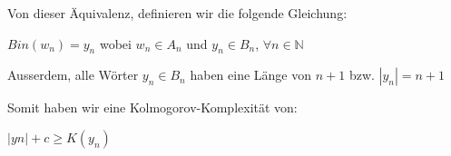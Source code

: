 \documentclass{article}
\begin{document}
    
    \par 
  	\noindent
  	Von dieser Äquivalenz, definieren wir die folgende Gleichung: 
	\begin{center}
	$Bin(w_{n}) = y_{n}$ wobei $w_{n} \in A_{n}$ und $y_{n} \in B_{n}$, $\forall n \in \mathbb{N}$
\end{center}	  	
  	
  	\par 
  	\noindent
  	Ausserdem, alle Wörter $y_{n} \in B_{n}$ haben eine Länge von $n + 1$ bzw. $|y_{n}| = n + 1$
  	
    \par 
    \noindent
    Somit haben wir eine Kolmogorov-Komplexität von: 
    \begin{center}
    $|yn| + c \ge K(y_{n})$
    \end{center}
\end{document}
